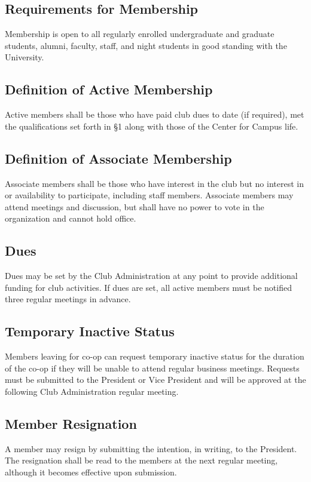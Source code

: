 \documentclass[english,11pt]{article}
\begin{document}
\subsection{Requirements for Membership}
Membership is open to all regularly enrolled undergraduate and graduate students, alumni, faculty, staff, and night students in good standing with the University.

\subsection{Definition of Active Membership}
Active members shall be those who have paid club dues to date (if required), met the qualifications set forth in §1 along with those of the Center for Campus life.

\subsection{Definition of Associate Membership}
Associate members shall be those who have interest in the club but no interest in or availability to participate, including staff members.
Associate members may attend meetings and discussion, but shall have no power to vote in the organization and cannot hold office.

\subsection{Dues}
Dues may be set by the Club Administration at any point to provide additional funding for club activities.
If dues are set, all active members must be notified three regular meetings in advance.

\subsection{Temporary Inactive Status}
Members leaving for co-op can request temporary inactive status for the duration of the co-op if they will be unable to attend regular business meetings. 
Requests must be submitted to the President or Vice President and will be approved at the following Club Administration regular meeting.

\subsection{Member Resignation}
A member may resign by submitting the intention, in writing, to the President.
The resignation shall be read to the members at the next regular meeting, although it becomes effective upon submission.
\end{document}
